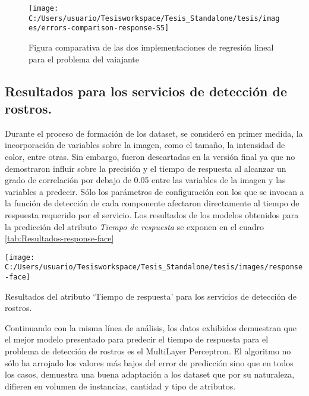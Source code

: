\begin{figure}[H]
\begin{centering}
\texttt{[image: C:/Users/usuario/Tesisworkspace/Tesis\_Standalone/tesis/images/errors-comparison-response-S5]}
\par\end{centering}

\caption{Figura comparativa de las dos implementaciones de regresión lineal
para el problema del vaiajante}
\end{figure}



\subsection{Resultados para los servicios de detección de rostros.}

Durante el proceso de formación de los dataset, se consideró en primer
medida, la incorporación de variables sobre la imagen, como el tamaño,
la intensidad de color, entre otras. Sin embargo, fueron descartadas
en la versión final ya que no demostraron influir sobre la precisión
y el tiempo de respuesta al alcanzar un grado de correlación por debajo
de 0.05 entre las variables de la imagen y las variables a predecir.
Sólo los parámetros de configuración con los que se invocan a la función
de detección de cada componente afectaron directamente al tiempo de
respuesta requerido por el servicio. Los resultados de los modelos
obtenidos para la predicción del atributo \emph{Tiempo de respuesta}
se exponen en el cuadro \ref{tab:Resultados-response-face}

\begin{table}[H]
\begin{centering}
\texttt{[image: C:/Users/usuario/Tesisworkspace/Tesis\_Standalone/tesis/images/response-face]}
\par\end{centering}

\caption{Resultados del atributo ‘Tiempo de respuesta’ para los servicios de
detección de rostros.\label{tab:Resultados-response-face}}
\end{table}


Continuando con la misma línea de análisis, los datos exhibidos demuestran
que el mejor modelo presentado para predecir el tiempo de respuesta
para el problema de detección de rostros es el MultiLayer Perceptron.
El algoritmo no sólo ha arrojado los valores más bajos del error de
predicción sino que en todos los casos, demuestra una buena adaptación
a los dataset que por su naturaleza, difieren en volumen de instancias,
cantidad y tipo de atributos. 

